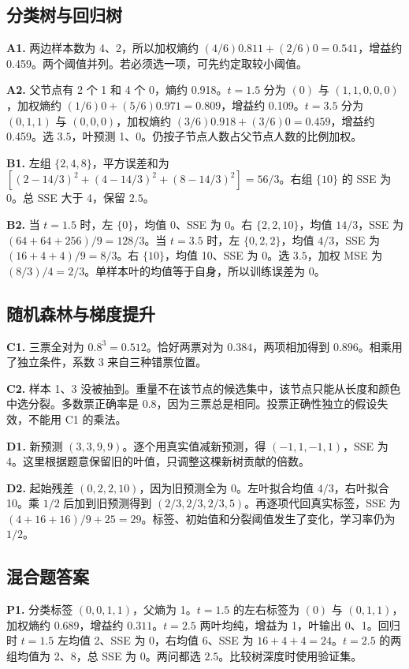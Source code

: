 \documentclass[UTF8,a4paper,11pt]{ctexart}
\begin{document}
\subsection{分类树与回归树}
\textbf{A1.} 两边样本数为 4、2，所以加权熵约 $(4/6)0.811+(2/6)0=0.541$，增益约 0.459。两个阈值并列。若必须选一项，可先约定取较小阈值。

\textbf{A2.} 父节点有 2 个 1 和 4 个 0，熵约 0.918。$t=1.5$ 分为 $(0)$ 与 $(1,1,0,0,0)$，加权熵约 $(1/6)0+(5/6)0.971=0.809$，增益约 0.109。$t=3.5$ 分为 $(0,1,1)$ 与 $(0,0,0)$，加权熵约 $(3/6)0.918+(3/6)0=0.459$，增益约 0.459。选 $3.5$，叶预测 1、0。仍按子节点人数占父节点人数的比例加权。

\textbf{B1.} 左组 $\{2,4,8\}$，平方误差和为 $[(2-14/3)^2+(4-14/3)^2+(8-14/3)^2]=56/3$。右组 $\{10\}$ 的 SSE 为 0。总 SSE 大于 4，保留 $2.5$。

\textbf{B2.} 当 $t=1.5$ 时，左 $\{0\}$，均值 0、SSE 为 0。右 $\{2,2,10\}$，均值 $14/3$，SSE 为 $(64+64+256)/9=128/3$。当 $t=3.5$ 时，左 $\{0,2,2\}$，均值 $4/3$，SSE 为 $(16+4+4)/9=8/3$。右 $\{10\}$，均值 10、SSE 为 0。选 $3.5$，加权 MSE 为 $(8/3)/4=2/3$。单样本叶的均值等于自身，所以训练误差为 0。

\subsection{随机森林与梯度提升}
\textbf{C1.} 三票全对为 $0.8^3=0.512$。恰好两票对为 $0.384$，两项相加得到 $0.896$。相乘用了独立条件，系数 3 来自三种错票位置。

\textbf{C2.} 样本 1、3 没被抽到。重量不在该节点的候选集中，该节点只能从长度和颜色中选分裂。多数票正确率是 0.8，因为三票总是相同。投票正确性独立的假设失效，不能用 C1 的乘法。

\textbf{D1.} 新预测 $(3,3,9,9)$。逐个用真实值减新预测，得 $(-1,1,-1,1)$，SSE 为 4。这里根据题意保留旧的叶值，只调整这棵新树贡献的倍数。

\textbf{D2.} 起始残差 $(0,2,2,10)$，因为旧预测全为 0。左叶拟合均值 $4/3$，右叶拟合 10。乘 $1/2$ 后加到旧预测得到 $(2/3,2/3,2/3,5)$。再逐项代回真实标签，SSE 为 $(4+16+16)/9+25=29$。标签、初始值和分裂阈值发生了变化，学习率仍为 $1/2$。

\clearpage
\subsection{混合题答案}
\textbf{P1.} 分类标签 $(0,0,1,1)$，父熵为 1。$t=1.5$ 的左右标签为 $(0)$ 与 $(0,1,1)$，加权熵约 $0.689$，增益约 $0.311$。$t=2.5$ 两叶均纯，增益为 1，叶输出 0、1。回归时 $t=1.5$ 左均值 2、SSE 为 0，右均值 6、SSE 为 $16+4+4=24$。$t=2.5$ 的两组均值为 2、8，总 SSE 为 0。两问都选 $2.5$。比较树深度时使用验证集。
\end{document}
